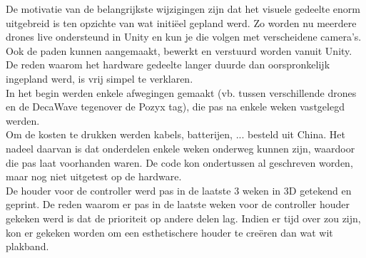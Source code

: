 De motivatie van de belangrijkste wijzigingen zijn dat het visuele gedeelte enorm uitgebreid is ten opzichte van wat initi\"eel gepland werd. Zo worden nu meerdere drones live ondersteund in Unity en kun je die volgen met verscheidene camera's. Ook de paden kunnen aangemaakt, bewerkt en verstuurd worden vanuit Unity.\\

De reden waarom het hardware gedeelte langer duurde dan oorspronkelijk ingepland werd, is vrij simpel te verklaren.\\
In het begin werden enkele afwegingen gemaakt (vb. tussen verschillende drones en de DecaWave tegenover de Pozyx tag), die pas na enkele weken vastgelegd werden.\\
Om de kosten te drukken werden kabels, batterijen, ... besteld uit China. Het nadeel daarvan is dat onderdelen enkele weken onderweg kunnen zijn, waardoor die pas laat voorhanden waren. De code kon ondertussen al geschreven worden, maar nog niet uitgetest op de hardware.\\
De houder voor de controller werd pas in de laatste 3 weken in 3D getekend en geprint.
De reden waarom er pas in de laatste weken voor de controller houder gekeken werd is dat de prioriteit op andere delen lag. Indien er tijd over zou zijn, kon er gekeken worden om een esthetischere houder te cre\"eren dan wat wit plakband.
